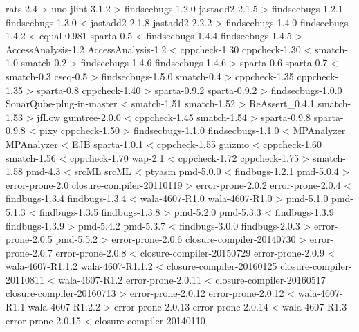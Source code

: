 rats-2.4 > uno
jlint-3.1.2 > findsecbugs-1.2.0
jastadd2-2.1.5 > findsecbugs-1.2.1
findsecbugs-1.3.0 < jastadd2-2.1.8
jastadd2-2.2.2 > findsecbugs-1.4.0
findsecbugs-1.4.2 < cqual-0.981
sparta-0.5 < findsecbugs-1.4.4
findsecbugs-1.4.5 > AccessAnalysis-1.2
AccessAnalysis-1.2 < cppcheck-1.30
cppcheck-1.30 < smatch-1.0
smatch-0.2 > findsecbugs-1.4.6
findsecbugs-1.4.6 > sparta-0.6
sparta-0.7 < smatch-0.3
cseq-0.5 > findsecbugs-1.5.0
smatch-0.4 > cppcheck-1.35
cppcheck-1.35 > sparta-0.8
cppcheck-1.40 > sparta-0.9.2
sparta-0.9.2 > findsecbugs-1.0.0
SonarQube-plug-in-master < smatch-1.51
smatch-1.52 > ReAssert\_0.4.1
smatch-1.53 > jfLow
gumtree-2.0.0 < cppcheck-1.45
smatch-1.54 > sparta-0.9.8
sparta-0.9.8 < pixy
cppcheck-1.50 > findsecbugs-1.1.0
findsecbugs-1.1.0 < MPAnalyzer
MPAnalyzer < EJB
sparta-1.0.1 < cppcheck-1.55
guizmo < cppcheck-1.60
smatch-1.56 < cppcheck-1.70
wap-2.1 < cppcheck-1.72
cppcheck-1.75 > smatch-1.58
pmd-4.3 < srcML
srcML < ptyasm
pmd-5.0.0 < findbugs-1.2.1
pmd-5.0.4 > error-prone-2.0
closure-compiler-20110119 > error-prone-2.0.2
error-prone-2.0.4 < findbugs-1.3.4
findbugs-1.3.4 < wala-4607-R1.0
wala-4607-R1.0 > pmd-5.1.0
pmd-5.1.3 < findbugs-1.3.5
findbugs-1.3.8 > pmd-5.2.0
pmd-5.3.3 < findbugs-1.3.9
findbugs-1.3.9 > pmd-5.4.2
pmd-5.3.7 < findbugs-3.0.0
findbugs-2.0.3 > error-prone-2.0.5
pmd-5.5.2 > error-prone-2.0.6
closure-compiler-20140730 > error-prone-2.0.7
error-prone-2.0.8 < closure-compiler-20150729
error-prone-2.0.9 < wala-4607-R1.1.2
wala-4607-R1.1.2 < closure-compiler-20160125
closure-compiler-20110811 < wala-4607-R1.2
error-prone-2.0.11 < closure-compiler-20160517
closure-compiler-20160713 > error-prone-2.0.12
error-prone-2.0.12 < wala-4607-R1.1
wala-4607-R1.2.2 > error-prone-2.0.13
error-prone-2.0.14 < wala-4607-R1.3
error-prone-2.0.15 < closure-compiler-20140110
